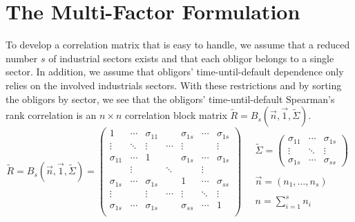 \documentclass[11pt,fleqn]{book} %
\begin{document}
\section{The Multi-Factor Formulation}

To develop a correlation matrix that is easy to handle, we assume that a 
reduced number $s$ of industrial sectors exists and that each obligor belongs 
to a single sector. In addition, we assume that obligors' time-until-default 
dependence only relies on the involved industrials sectors. With these 
restrictions and by sorting the obligors by sector, we see that the obligors' 
time-until-default Spearman's rank correlation is an $n {\times} n$ correlation
block matrix $\widetilde{R} = B_s(\vec{n},\vec{1},\widetilde{\Sigma})$.
\begin{displaymath}
	\widetilde{R} = B_s(\vec{n},\vec{1},\widetilde{\Sigma}) = 
	\left(
	\begin{array}{ccccccc}
		1           & \cdots & \sigma_{11} &        & \sigma_{1s} & \cdots & \sigma_{1s} \\
		\vdots      & \ddots & \vdots      & \cdots & \vdots      &        & \vdots      \\
		\sigma_{11} & \cdots & 1           &        & \sigma_{1s} & \cdots & \sigma_{1s} \\
		
		            & \vdots &             & \ddots &             & \vdots &             \\
		
		\sigma_{1s} & \cdots & \sigma_{1s} &        & 1           & \cdots & \sigma_{ss} \\
		\vdots      &        & \vdots      & \cdots & \vdots      & \ddots & \vdots      \\
		\sigma_{1s} & \cdots & \sigma_{1s} &        & \sigma_{ss} & \cdots & 1           \\
	\end{array}
	\right)
	\quad 
	\begin{array}{l}
		\widetilde{\Sigma} = 
		\left(
		\begin{array}{ccc}
			\sigma_{11} & \cdots & \sigma_{1s} \\
			\vdots      & \ddots & \vdots      \\
			\sigma_{1s} & \cdots & \sigma_{ss}
		\end{array}
		\right) \\
		\\
		\vec{n} = (n_1,\dots,n_s) \\
		\\
		n = \displaystyle \sum_{i=1}^{s} n_i
	\end{array}
\end{displaymath}
\end{document}
